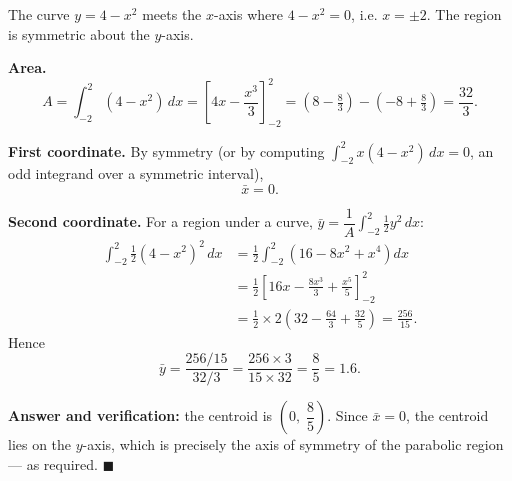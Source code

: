 \documentclass[11pt]{article}
\begin{document}
\begin{corrige}
The curve $y = 4 - x^2$ meets the $x$-axis where $4 - x^2 = 0$, i.e. $x = \pm 2$. The region is symmetric about the $y$-axis.

\textbf{Area.}
\[
A = \int_{-2}^{2} (4 - x^2)\,dx = \left[4x - \frac{x^3}{3}\right]_{-2}^{2} = \left(8 - \tfrac{8}{3}\right) - \left(-8 + \tfrac{8}{3}\right) = \frac{32}{3}.
\]

\textbf{First coordinate.} By symmetry (or by computing $\int_{-2}^{2} x(4-x^2)\,dx = 0$, an odd integrand over a symmetric interval),
\[
\bar{x} = 0.
\]

\textbf{Second coordinate.} For a region under a curve, $\bar{y} = \dfrac{1}{A}\displaystyle\int_{-2}^{2} \tfrac12 y^2\,dx$:
\begin{align*}
\int_{-2}^{2} \tfrac12 (4-x^2)^2\,dx &= \tfrac12\int_{-2}^{2}\left(16 - 8x^2 + x^4\right)dx\\
&= \tfrac12\left[16x - \frac{8x^3}{3} + \frac{x^5}{5}\right]_{-2}^{2}\\
&= \tfrac12 \times 2\left(32 - \frac{64}{3} + \frac{32}{5}\right) = \frac{256}{15}.
\end{align*}
Hence
\[
\bar{y} = \frac{256/15}{32/3} = \frac{256 \times 3}{15 \times 32} = \frac{8}{5} = 1.6.
\]

\textbf{Answer and verification:} the centroid is $\left(0,\; \dfrac{8}{5}\right)$. Since $\bar{x} = 0$, the centroid lies on the $y$-axis, which is precisely the axis of symmetry of the parabolic region — as required. $\blacksquare$
\end{corrige}
\end{document}
